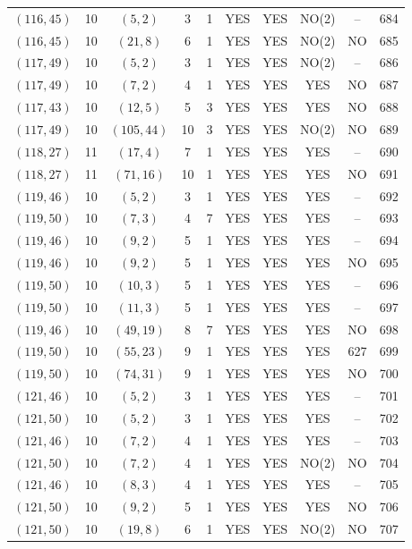 \begin{longtable}{|c|c|c|c|c|c|c|c|c|c|}
$(116, 45)$ & 10 & $(5, 2)$ & 3 & 1 & YES & YES & NO(2) & -- & 684\\
$(116, 45)$ & 10 & $(21, 8)$ & 6 & 1 & YES & YES & NO(2) & NO & 685\\
$(117, 49)$ & 10 & $(5, 2)$ & 3 & 1 & YES & YES & NO(2) & -- & 686\\
$(117, 49)$ & 10 & $(7, 2)$ & 4 & 1 & YES & YES & YES & NO & 687\\
$(117, 43)$ & 10 & $(12, 5)$ & 5 & 3 & YES & YES & YES & NO & 688\\
$(117, 49)$ & 10 & $(105, 44)$ & 10 & 3 & YES & YES & NO(2) & NO & 689\\
$(118, 27)$ & 11 & $(17, 4)$ & 7 & 1 & YES & YES & YES & -- & 690\\
$(118, 27)$ & 11 & $(71, 16)$ & 10 & 1 & YES & YES & YES & NO & 691\\
$(119, 46)$ & 10 & $(5, 2)$ & 3 & 1 & YES & YES & YES & -- & 692\\
$(119, 50)$ & 10 & $(7, 3)$ & 4 & 7 & YES & YES & YES & -- & 693\\
$(119, 46)$ & 10 & $(9, 2)$ & 5 & 1 & YES & YES & YES & -- & 694\\
$(119, 46)$ & 10 & $(9, 2)$ & 5 & 1 & YES & YES & YES & NO & 695\\
$(119, 50)$ & 10 & $(10, 3)$ & 5 & 1 & YES & YES & YES & -- & 696\\
$(119, 50)$ & 10 & $(11, 3)$ & 5 & 1 & YES & YES & YES & -- & 697\\
$(119, 46)$ & 10 & $(49, 19)$ & 8 & 7 & YES & YES & YES & NO & 698\\
$(119, 50)$ & 10 & $(55, 23)$ & 9 & 1 & YES & YES & YES & 627 & 699\\
$(119, 50)$ & 10 & $(74, 31)$ & 9 & 1 & YES & YES & YES & NO & 700\\
$(121, 46)$ & 10 & $(5, 2)$ & 3 & 1 & YES & YES & YES & -- & 701\\
$(121, 50)$ & 10 & $(5, 2)$ & 3 & 1 & YES & YES & YES & -- & 702\\
$(121, 46)$ & 10 & $(7, 2)$ & 4 & 1 & YES & YES & YES & -- & 703\\
$(121, 50)$ & 10 & $(7, 2)$ & 4 & 1 & YES & YES & NO(2) & NO & 704\\
$(121, 46)$ & 10 & $(8, 3)$ & 4 & 1 & YES & YES & YES & -- & 705\\
$(121, 50)$ & 10 & $(9, 2)$ & 5 & 1 & YES & YES & YES & NO & 706\\
$(121, 50)$ & 10 & $(19, 8)$ & 6 & 1 & YES & YES & NO(2) & NO & 707\\

\end{longtable}
